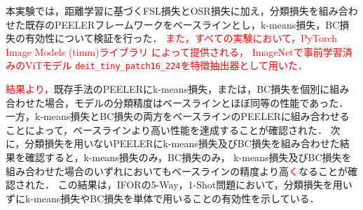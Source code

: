 \documentclass[a4paper,11pt,nomag]{jsreport}
\begin{document}
% 
本実験では，距離学習に基づくFSL損失とOSR損失に加え，分類損失を組み合わせた既存のPEELERフレームワークをベースラインとし，k-means損失，BC損失の有効性について検証を行った．
\textcolor{red}{また，すべての実験において，PyTorch Image Models (timm)ライブラリ \cite{timm}によって提供される，
ImageNetで事前学習済みのViTモデル \texttt{deit\_tiny\_patch16\_224}を特徴抽出器として用いた．}

\textcolor{red}{結果より，}既存手法のPEELERにk-means損失，または，BC損失を個別に組み合わせた場合，モデルの分類精度はベースラインとほぼ同等の性能であった．
一方，k-means損失とBC損失の両方をベースラインのPEELERに組み合わせることによって，ベースラインより高い性能を達成することが確認された．
次に，分類損失を用いないPEELERにk-means損失及びBC損失を組み合わせた結果を確認すると，k-means損失のみ，BC損失のみ，
k-means損失及びBC損失を組み合わせた場合のいずれにおいてもベースラインの精度より高\textcolor{red}{く}なることが確認された．
この結果は，IFORの5-Way，1-Shot問題において，分類損失を用いずにk-means損失やBC損失を単体で用いることの有効性を示している．

\end{document}
